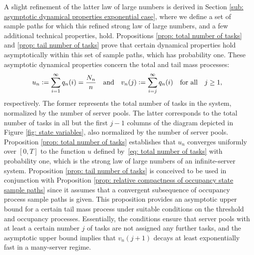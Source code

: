 \documentclass[a4paper, 12pt]{article}
\theoremstyle{definition}
\newcommand{\defeq}{\vcentcolon=}
\begin{document}
A slight refinement of the latter law of large numbers is derived in Section \ref{sub: asymptotic dynamical properties exponential case}, where we define a set of sample paths for which this refined strong law of large numbers, and a few additional technical properties, hold. Propositions \ref{prop: total number of tasks} and \ref{prop: tail number of tasks} prove that certain dynamical properties hold asymptotically within this set of sample paths, which has probability one. These asymptotic dynamical properties concern the total and tail mass processes:
\begin{equation}
	\label{eq: total and tail mass processes}
	u_n \defeq \sum_{i = 1}^\infty q_n(i) = \frac{N_n}{n} \quad \text{and} \quad v_n(j) \defeq \sum_{i = j}^\infty q_n(i) \quad \text{for all} \quad j \geq 1,
\end{equation}
respectively. The former represents the total number of tasks in the system, normalized by the number of server pools. The latter corresponds to the total number of tasks in all but the first $j - 1$ columns of the diagram depicted in Figure \ref{fig: state variables}, also normalized by the number of server pools. Proposition \ref{prop: total number of tasks} establishes that $u_n$ converges uniformly over $[0, T]$ to the function $u$ defined by~\eqref{eq: total number of tasks} with probability one, which is the strong law of large numbers of an infinite-server system. Proposition \ref{prop: tail number of tasks} is conceived to be used in conjunction with Proposition \ref{prop: relative compactness of occupancy state sample paths} since it assumes that a convergent subsequence of occupancy process sample paths is given. This proposition provides an asymptotic upper bound for a certain tail mass process under suitable conditions on the threshold and occupancy processes. Essentially, the conditions ensure that server pools with at least a certain number $j$ of tasks are not assigned any further tasks, and the asymptotic upper bound implies that $v_n(j + 1)$ decays at least exponentially fast in a many-server regime.

\begin{figure}[omitted: a diagram of this paper's results, not reproduced here]\label{fig: proof diagram}\end{figure}
\end{document}
